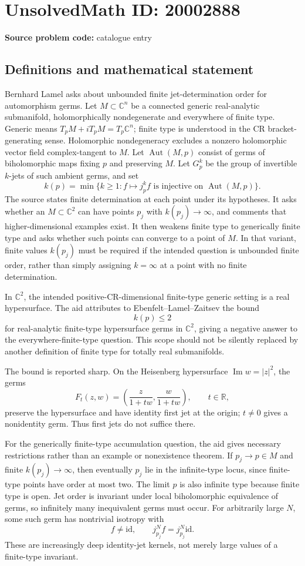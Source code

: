 \documentclass[11pt]{article}
\newcommand{\R}{\mathbb{R}}
\newcommand{\C}{\mathbb{C}}
\begin{document}
\section*{UnsolvedMath ID: 20002888}
\textbf{Source problem code:} catalogue entry
\subsection{Definitions and mathematical statement}
Bernhard Lamel asks about unbounded finite jet-determination order for automorphism germs. Let \(M\subset\C^n\) be a connected generic real-analytic submanifold, holomorphically nondegenerate and everywhere of finite type. Generic means \(T_pM+iT_pM=T_p\C^n\); finite type is understood in the CR bracket-generating sense. Holomorphic nondegeneracy excludes a nonzero holomorphic vector field complex-tangent to \(M\). Let \(\operatorname{Aut}(M,p)\) consist of germs of biholomorphic maps fixing \(p\) and preserving \(M\). Let \(G_p^k\) be the group of invertible \(k\)-jets of such ambient germs, and set
\[
 k(p)=\min\{k\ge1:f\mapsto j_p^kf
          \text{ is injective on }\operatorname{Aut}(M,p)\}.
\]
The source states finite determination at each point under its hypotheses. It asks whether an \(M\subset\C^2\) can have points \(p_j\) with \(k(p_j)\to\infty\), and comments that higher-dimensional examples exist. It then weakens finite type to generically finite type and asks whether such points can converge to a point of \(M\). In that variant, finite values \(k(p_j)\) must be required if the intended question is unbounded finite order, rather than simply assigning \(k=\infty\) at a point with no finite determination.

In \(\C^2\), the intended positive-CR-dimensional finite-type generic setting is a real hypersurface. The aid attributes to Ebenfelt--Lamel--Zaitsev the bound
\[
 k(p)\le2
\]
for real-analytic finite-type hypersurface germs in \(\C^2\), giving a negative answer to the everywhere-finite-type question. This scope should not be silently replaced by another definition of finite type for totally real submanifolds.

The bound is reported sharp. On the Heisenberg hypersurface \(\operatorname{Im}w=|z|^2\), the germs
\[
 F_t(z,w)=\left(\frac z{1+tw},\frac w{1+tw}\right),\qquad t\in\R,
\]
preserve the hypersurface and have identity first jet at the origin; \(t\ne0\) gives a nonidentity germ. Thus first jets do not suffice there.

For the generically finite-type accumulation question, the aid gives necessary restrictions rather than an example or nonexistence theorem. If \(p_j\to p\in M\) and finite \(k(p_j)\to\infty\), then eventually \(p_j\) lie in the infinite-type locus, since finite-type points have order at most two. The limit \(p\) is also infinite type because finite type is open. Jet order is invariant under local biholomorphic equivalence of germs, so infinitely many inequivalent germs must occur. For arbitrarily large \(N\), some such germ has nontrivial isotropy with
\[
 f\ne\mathrm{id},\qquad j_{p_j}^Nf=j_{p_j}^N\mathrm{id}.
\]
These are increasingly deep identity-jet kernels, not merely large values of a finite-type invariant.
\end{document}
